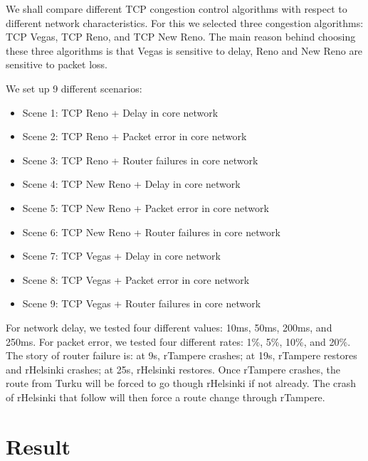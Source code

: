 \documentclass[conference,a4paper]{IEEEtran}
\begin{document}
We shall compare different TCP congestion control algorithms with respect to different network characteristics.
For this we selected three congestion algorithms: TCP Vegas, TCP Reno, and TCP New Reno.
The main reason behind choosing these three algorithms is that Vegas is sensitive to delay, Reno and New Reno are sensitive to packet loss.

We set up 9 different scenarios:
\begin{itemize}
\item Scene 1: TCP Reno + Delay in core network
\item Scene 2: TCP Reno + Packet error in core network
\item Scene 3: TCP Reno + Router failures in core network
\item Scene 4: TCP New Reno + Delay in core network
\item Scene 5: TCP New Reno + Packet error in core network
\item Scene 6: TCP New Reno + Router failures in core network
\item Scene 7: TCP Vegas + Delay in core network
\item Scene 8: TCP Vegas + Packet error in core network
\item Scene 9: TCP Vegas + Router failures in core network
\end{itemize}

For network delay, we tested four different values: 10ms, 50ms, 200ms, and 250ms.
For packet error, we tested four different rates: 1\%, 5\%, 10\%, and 20\%.
The story of router failure is: at 9s, rTampere crashes; at 19s, rTampere restores and rHelsinki crashes; at 25s, rHelsinki restores.
Once rTampere crashes, the route from Turku will be forced to go though rHelsinki if not already.
The crash of rHelsinki that follow will then force a route change through rTampere.


\section{Result}

\end{document}
